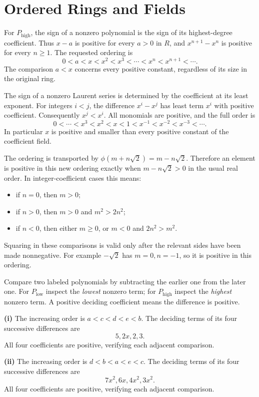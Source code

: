 \section{Ordered Rings and Fields}

For $P_{\mathrm{high}}$, the sign of a nonzero polynomial is the sign of its highest-degree coefficient. Thus $x-a$ is positive for every $a>0$ in $R$, and $x^{n+1}-x^n$ is positive for every $n\ge1$. The requested ordering is
\[\boxed{0<a<x<x^2<x^3<\cdots<x^n<x^{n+1}<\cdots}.
\]
The comparison $a<x$ concerns every positive constant, regardless of its size in the original ring.

The sign of a nonzero Laurent series is determined by the coefficient at its least exponent. For integers $i<j$, the difference $x^i-x^j$ has least term $x^i$ with positive coefficient. Consequently $x^j<x^i$. All monomials are positive, and the full order is
\[\boxed{0<\cdots<x^3<x^2<x<1<x^{-1}<x^{-2}<x^{-3}<\cdots}.
\]
In particular $x$ is positive and smaller than every positive constant of the coefficient field.

The ordering is transported by $\phi(m+n\sqrt2)=m-n\sqrt2$. Therefore an element is positive in this new ordering exactly when $m-n\sqrt2>0$ in the usual real order. In integer-coefficient cases this means:
\begin{itemize}
\item if $n=0$, then $m>0$;
\item if $n>0$, then $m>0$ and $m^2>2n^2$;
\item if $n<0$, then either $m\ge0$, or $m<0$ and $2n^2>m^2$.
\end{itemize}
Squaring in these comparisons is valid only after the relevant sides have been made nonnegative. For example $-\sqrt2$ has $m=0,n=-1$, so it is positive in this ordering.

Compare two labeled polynomials by subtracting the earlier one from the later one. For $P_{\mathrm{low}}$ inspect the \emph{lowest} nonzero term; for $P_{\mathrm{high}}$ inspect the \emph{highest} nonzero term. A positive deciding coefficient means the difference is positive.\par
\textbf{(i)} The increasing order is $\boxed{a<c<d<e<b}$. The deciding terms of its four successive differences are
\[5, 2x, 2, 3.
\]
All four coefficients are positive, verifying each adjacent comparison.\par
\textbf{(ii)} The increasing order is $\boxed{d<b<a<e<c}$. The deciding terms of its four successive differences are
\[7x^{2}, 6x, 4x^{2}, 3x^{2}.
\]
All four coefficients are positive, verifying each adjacent comparison.\par



